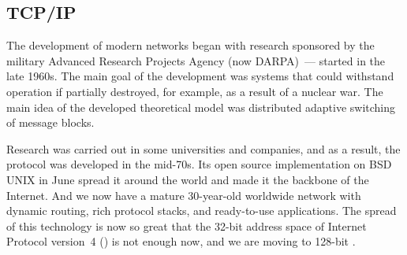 \subsection*{TCP/IP} %

The development of modern networks began with research sponsored by the military
Advanced Research Projects Agency (now DARPA)~---  started
in the late 1960s. The main goal of the development was systems that
could withstand operation if partially destroyed, for example, as a result of
a nuclear war. The main idea of the developed theoretical model was distributed
adaptive switching of message blocks.

Research was carried out in some universities and companies, and as a result,
the  protocol was developed in the mid-70s. Its open source
implementation on BSD UNIX in June  spread it around the world
and made it the backbone of the Internet. And we now have a mature
30-year-old worldwide network with dynamic routing, rich protocol stacks,
and ready-to-use applications. The spread of this technology is now so
great that the 32-bit address space of Internet Protocol version~4 ()
is not enough now, and we are moving to 128-bit .
